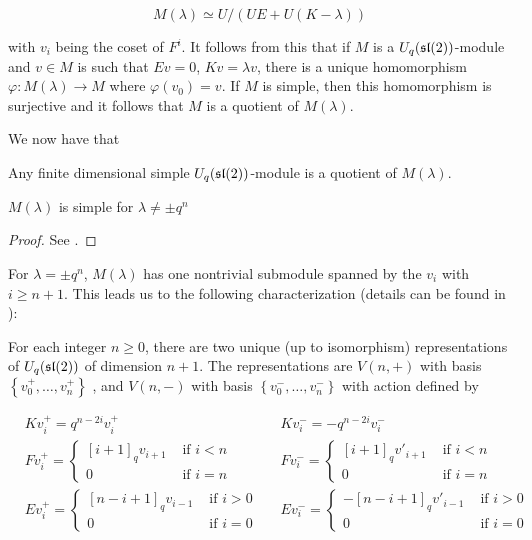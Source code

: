\begin{equation}
    M(\lambda) \simeq U/(UE + U(K-\lambda))
\end{equation}

with $v_i$ being the coset of $F^i$. It follows from this that if $M$ is a
$U_q(\mathfrak{sl}(2))$-module and $v \in M$ is such that $Ev = 0$, $Kv = \lambda v$, there
is a unique homomorphism $\varphi: M(\lambda) \to M$ where $\varphi(v_0) = v$.
If $M$ is simple, then this homomorphism is surjective and it follows that $M$
is a quotient of $M(\lambda)$. 

We now have that 
\begin{claim}
    Any finite dimensional simple $U_q(\mathfrak{sl}(2))$-module is a quotient of $M(\lambda)$.
\end{claim}

\begin{claim}
    $M(\lambda)$ is simple for $\lambda \neq \pm q^n$
\end{claim}

\begin{proof}
    See \cite{Jantzen1996}.
\end{proof}

For $\lambda = \pm q^{n}$, $M(\lambda)$ has one nontrivial submodule spanned by the $v_i$ with $i \geq n+1$.
This leads us to the following characterization (details can be found in \cite{Jantzen1996}):


For each integer $n \geq 0$, there are two unique (up to isomorphism)
representations of $U_q(\mathfrak{sl}(2))$ of dimension $n+1$. 
The representations are $V(n,+)$ with basis $\left\{ v^+_0, \ldots, v^+_n
\right\}$ , and $V(n,-)$ with basis $\left\{ v^-_0, \ldots, v^-_n \right\}$
with action defined by 

\begin{align*}
    &K v^+_i = q^{n-2i} v^+_i  &
    &K v^-_i = -q^{n-2i} v^-_i \\
    &F v^+_i = \begin{cases} [i+1]_qv_{i+1}& \text{ if $i < n$} \\ 0& \text{ if $i = n$} \end{cases} &
    &F v^-_i = \begin{cases} [i+1]_qv'_{i+1}& \text{ if $i < n$} \\ 0& \text{ if $i = n$} \end{cases} \\
    &E v^+_i = \begin{cases} 
                     [n-i+1]_qv_{i-1}& \text{ if $i > 0$} \\ 
                    0& \text{ if $i = 0$} 
             \end{cases} &
    &E v^-_i = \begin{cases} 
                    -[n-i+1]_q v'_{i-1}& \text{ if $i > 0$} \\ 
                    0& \text{ if $i = 0$} 
             \end{cases}
\end{align*}

